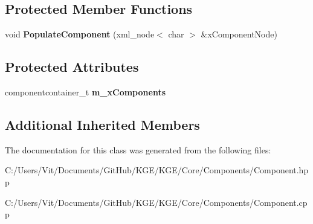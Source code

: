 \subsection*{Protected Member Functions}
\begin{DoxyCompactItemize}
\item 
\hypertarget{class_k_g_e_1_1_component_container_a9126f38630214eb22f670d1f07f78e1c}{void {\bfseries Populate\-Component} (xml\-\_\-node$<$ char $>$ \&x\-Component\-Node)}\label{class_k_g_e_1_1_component_container_a9126f38630214eb22f670d1f07f78e1c}

\end{DoxyCompactItemize}
\subsection*{Protected Attributes}
\begin{DoxyCompactItemize}
\item 
\hypertarget{class_k_g_e_1_1_component_container_a745972f0622830dc7380e5dd91016071}{componentcontainer\-\_\-t {\bfseries m\-\_\-x\-Components}}\label{class_k_g_e_1_1_component_container_a745972f0622830dc7380e5dd91016071}

\end{DoxyCompactItemize}
\subsection*{Additional Inherited Members}


The documentation for this class was generated from the following files\-:\begin{DoxyCompactItemize}
\item 
C\-:/\-Users/\-Vit/\-Documents/\-Git\-Hub/\-K\-G\-E/\-K\-G\-E/\-Core/\-Components/Component.\-hpp\item 
C\-:/\-Users/\-Vit/\-Documents/\-Git\-Hub/\-K\-G\-E/\-K\-G\-E/\-Core/\-Components/Component.\-cpp\end{DoxyCompactItemize}
